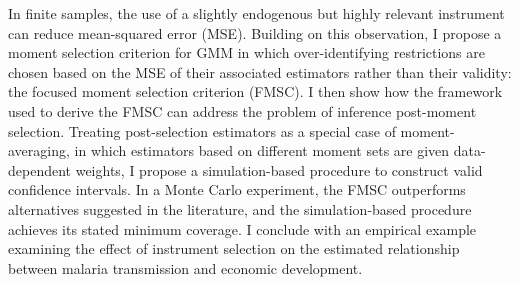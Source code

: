 In finite samples, the use of a slightly endogenous but highly relevant instrument can reduce mean-squared error (MSE). Building on this observation, I propose a moment selection criterion for GMM in which over-identifying restrictions are chosen based on the MSE of their associated estimators rather than their validity: the focused moment selection criterion (FMSC). I then show how the framework used to derive the FMSC can address the problem of inference post-moment selection. Treating post-selection estimators as a special case of moment-averaging, in which estimators based on different moment sets are given data-dependent weights, I propose a simulation-based procedure to construct valid confidence intervals. In a Monte Carlo experiment, the FMSC outperforms alternatives suggested in the literature, and the simulation-based procedure achieves its stated minimum coverage. I conclude with an empirical example examining the effect of instrument selection on the estimated relationship between malaria transmission and economic development.